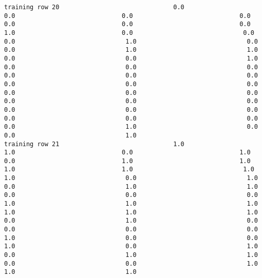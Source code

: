 \documentclass[11pt]{article}
\begin{document}
\begin{verbatim}
training row 20                               0.0                             0.0                             0.0                             0.0                             0.0                             0.0                             0.0                             1.0                             0.0                              0.0                              0.0                              1.0                              0.0                              0.0                              1.0                              1.0                              0.0                              0.0                              1.0                              0.0                              0.0                              0.0                              0.0                              0.0                              0.0                              0.0                              0.0                              0.0                              0.0                              0.0                              0.0                              0.0                              0.0                              0.0                              0.0                              0.0                              0.0                              0.0                              0.0                              0.0                              0.0                              1.0                              0.0                              0.0                              1.0
training row 21                               1.0                             1.0                             0.0                             1.0                             0.0                             1.0                             1.0                             1.0                             1.0                              1.0                              1.0                              0.0                              1.0                              0.0                              1.0                              1.0                              0.0                              0.0                              0.0                              1.0                              1.0                              1.0                              1.0                              1.0                              1.0                              0.0                              1.0                              0.0                              0.0                              0.0                              0.0                              1.0                              0.0                              0.0                              1.0                              0.0                              1.0                              0.0                              1.0                              1.0                              0.0                              0.0                              1.0                              1.0                              1.0

\end{verbatim}
\end{document}
